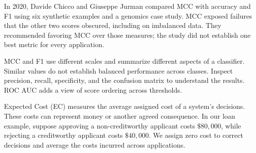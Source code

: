 
{In 2020, Davide Chicco and Giuseppe Jurman compared MCC with accuracy and F1 using six synthetic examples and a genomics case study. MCC exposed failures that the other two scores obscured, including on imbalanced data. They recommended favoring MCC over those measures; the study did not establish one best metric for every application.}

\metricsecondary

MCC and F1 use different scales and summarize different aspects of a classifier. Similar values do not establish balanced performance across classes. Inspect precision, recall, specificity, and the confusion matrix to understand the results. ROC AUC adds a view of score ordering across thresholds.

\metricend
\clearpage
\thispagestyle{classificationstyle}
\label{sec:ec}

Expected Cost (EC) measures the average assigned cost of a system's decisions. These costs can represent money or another agreed consequence. In our loan example, suppose approving a non-creditworthy applicant costs $\$80{,}000$, while rejecting a creditworthy applicant costs $\$40{,}000$. We assign zero cost to correct decisions and average the costs incurred across applications.

\begin{metricformula}
\end{metricformula}

